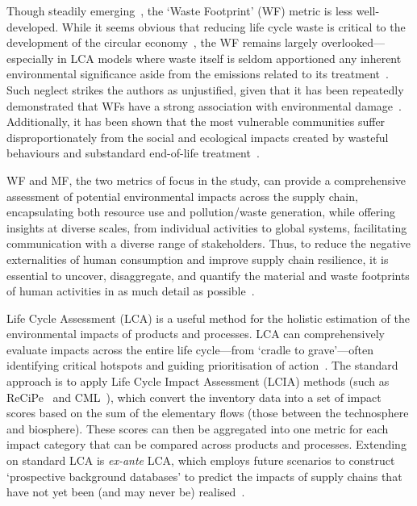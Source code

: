 Though steadily emerging~\citep{laurenti2016wastefootprint,demirer2019wastefootprint,guillotreau2023wastefootprint}, the `Waste Footprint' (WF) metric is less well-developed. While it seems obvious that reducing life cycle waste is critical to the development of the circular economy~\citep{towa2020wastefootprint,ellenmacarthur2015ce}, the WF remains largely overlooked---especially in LCA models where waste itself is seldom apportioned any inherent environmental significance aside from the emissions related to its treatment~\citep{laurenti2023wastefootprint}. Such neglect strikes the authors as unjustified, given that it has been repeatedly demonstrated that WFs have a strong association with environmental damage~\citep{laurenti2023wastefootprint,doka2024publications, ridoutt2010wasteimpacts,jaio2013wasteabsorbtionfootprint}. Additionally, it has been shown that the most vulnerable communities suffer disproportionately from the social and ecological impacts created by wasteful behaviours and substandard end-of-life treatment~\citep{pellow2023envjusticewaste,akese2018envjustice}.

WF and MF, the two metrics of focus in the study, can provide a comprehensive assessment of potential environmental impacts across the supply chain, encapsulating both resource use and pollution/waste generation, while offering insights at diverse scales, from individual activities to global systems, facilitating communication with a diverse range of stakeholders. Thus, to reduce the negative externalities of human consumption and improve supply chain resilience, it is essential to uncover, disaggregate, and quantify the material and waste footprints of human activities in as much detail as possible~\citep{bisinella2024wastelca, towa2020wastefootprint,berger2020mineralsinlca,sonderegger2020mineralsinlca}.


Life Cycle Assessment (LCA) is a useful method for the holistic estimation of the environmental impacts of products and processes. LCA can comprehensively evaluate impacts across the entire life cycle---from `cradle to grave'---often identifying critical hotspots and guiding prioritisation of action~\citep{guinee2011lca}. The standard approach is to apply Life Cycle Impact Assessment (LCIA) methods (such as ReCiPe~\citep{huijbregts2016recipe} and CML~\citep{guinee2002cml}), which convert the inventory data into a set of impact scores based on the sum of the elementary flows (those between the technosphere and biosphere). These scores can then be aggregated into one metric for each impact category that can be compared across products and processes. Extending on standard LCA is \textit{ex-ante} LCA, which employs future scenarios to construct `prospective background databases' to predict the impacts of supply chains that have not yet been (and may never be) realised~\citep{cucurachi2018exante,blanco2020exante}.

